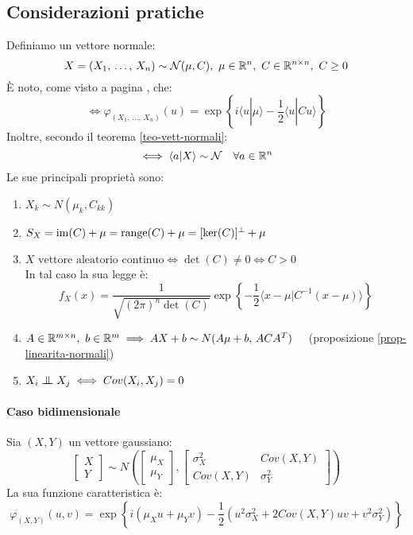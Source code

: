\subsection{Considerazioni pratiche}
Definiamo un vettore normale:
$$ X = (X_1, \, \dots, \, X_n) \sim \mathcal N (\mu, C), \ \mu \in \mathbb R^n, \ C \in \mathbb R^{n \times n},\ C \ge 0 $$
È noto, come visto a pagina \pageref{caratt-normale}, che:
$$ \iff \varphi_{(X_1, \, \dots, \, X_n)} (u) = \exp \left\{i\langle u| \mu\rangle  - \frac{1}{2} \langle u| Cu\rangle \right\} $$
Inoltre, secondo il teorema \ref{teo-vett-normali}:
$$ \iff \langle a | X\rangle  \sim \mathcal N \quad \forall a \in \mathbb R^n $$
Le sue principali proprietà sono:
\begin{enumerate}
  \item $ X_k \sim N (\mu_k, C_{kk}) $
  \item $ S_X = \operatorname{im}(C) + \mu = \operatorname{range}(C) + \mu = [\ker(C)]^{\perp} + \mu $
  \item $ X \text{ vettore aleatorio continuo} \iff \det(C) \neq 0 \iff C > 0 $\\
    In tal caso la sua legge è:
    $$f_X(x)= \dfrac{1}{\sqrt{(2 \pi)^n \det(C)}} \exp \left \{ -\dfrac{1}{2} \langle  x- \mu| C^{-1} (x-\mu) \rangle \right \}$$
  \item $ A \in \mathbb R^{m \times n}, \ b \in \mathbb R^m \implies AX+b \sim N(A\mu+b,\, ACA^T) \quad$ (proposizione \ref{prop-linearita-normali})
  \item $X_i \indep X_j \iff Cov(X_i, X_j) = 0$
\end{enumerate}

\paragraph{Caso bidimensionale}
Sia $(X,Y)$ un vettore gaussiano:
$$\begin{bmatrix}X\\Y\end{bmatrix} \sim N\left( \begin{bmatrix} \mu_X\\ \mu_Y \end{bmatrix}, \begin{bmatrix} \sigma^2_X & Cov(X,Y)\\Cov(X,Y) & \sigma^2_Y\end{bmatrix}\right)$$
La sua funzione caratteristica è:
$$\varphi_{(X,Y)}(u,v) = \exp \left \{ i(\mu_X u + \mu_Y v) - \dfrac{1}{2} (u^2 \sigma^2_X + 2Cov(X,Y)uv + v^2 \sigma^2_Y) \right \}$$

